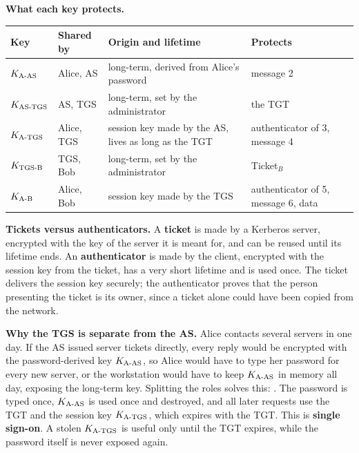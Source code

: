 \textbf{What each key protects.}
\begin{center}\small
\begin{tabular}{@{}llll@{}}
\toprule
Key & Shared by & Origin and lifetime & Protects\\
\midrule
$K_{\text{A-AS}}$ & Alice, AS & long-term, derived from Alice's password & message 2\\
$K_{\text{AS-TGS}}$ & AS, TGS & long-term, set by the administrator & the TGT\\
$K_{\text{A-TGS}}$ & Alice, TGS & session key made by the AS, lives as long as the TGT & authenticator of 3, message 4\\
$K_{\text{TGS-B}}$ & TGS, Bob & long-term, set by the administrator & Ticket$_B$\\
$K_{\text{A-B}}$ & Alice, Bob & session key made by the TGS & authenticator of 5, message 6, data\\
\bottomrule
\end{tabular}
\end{center}

\textbf{Tickets versus authenticators.} A \textbf{ticket} is made by a Kerberos server, encrypted with the key of the server it is meant for, and can be reused until its lifetime ends. An \textbf{authenticator} is made by the client, encrypted with the session key from the ticket, has a very short lifetime and is used once. The ticket delivers the session key securely; the authenticator proves that the person presenting the ticket is its owner, since a ticket alone could have been copied from the network.

\textbf{Why the TGS is separate from the AS.} Alice contacts several servers in one day. If the AS issued server tickets directly, every reply would be encrypted with the password-derived key $K_{\text{A-AS}}$, so Alice would have to type her password for every new server, or the workstation would have to keep $K_{\text{A-AS}}$ in memory all day, exposing the long-term key. Splitting the roles solves this: . The password is typed once, $K_{\text{A-AS}}$ is used once and destroyed, and all later requests use the TGT and the session key $K_{\text{A-TGS}}$, which expires with the TGT. This is \textbf{single sign-on}. A stolen $K_{\text{A-TGS}}$ is useful only until the TGT expires, while the password itself is never exposed again.

